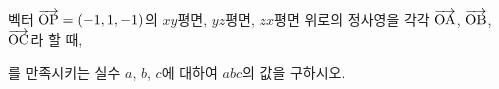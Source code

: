 벡터 $\overrightarrow{\mathrm{OP}}=(-1{,}\mkern3mu\mathopen{}1{,}\mkern3mu\mathopen{}-1)$의 $xy$평면, $yz$평면, $zx$평면 위로의 정사영을 각각 $\overrightarrow{\mathrm{OA}}$, $\overrightarrow{\mathrm{OB}}$, $\overrightarrow{\mathrm{OC}}$라 할 때, \par\smallskip{}\par\smallskip\noindent 를 만족시키는 실수 $a$, $b$, $c$에 대하여 $abc$의 값을 구하시오.
